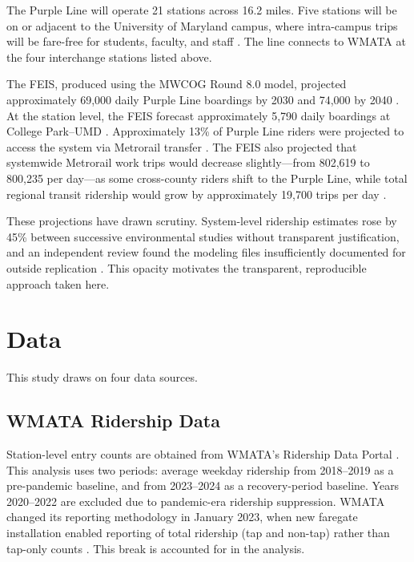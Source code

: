 \documentclass[11pt]{article}
\begin{document}
The Purple Line will operate 21 stations across 16.2 miles. Five stations
will be on or adjacent to the University of Maryland campus, where
intra-campus trips will be fare-free for students, faculty, and staff
\citep{umd_purpleline}. The line connects to WMATA at the four interchange
stations listed above.

The FEIS, produced using the MWCOG Round 8.0 model, projected approximately
69,000 daily Purple Line boardings by 2030 and 74,000 by 2040
\citep{atkinsrealis}. At the station level, the FEIS forecast approximately
5,790 daily boardings at College Park--UMD \citep{collegeparkhousing}.
Approximately 13\% of Purple Line riders were projected to access the system
via Metrorail transfer \citep{sentinel2017}. The FEIS also projected that
systemwide Metrorail work trips would decrease slightly---from 802,619 to
800,235 per day---as some cross-county riders shift to the Purple Line,
while total regional transit ridership would grow by approximately 19,700
trips per day \citep{sentinel2017}.

These projections have drawn scrutiny. System-level ridership estimates rose
by 45\% between successive environmental studies without transparent
justification, and an independent review found the modeling files
insufficiently documented for outside replication \citep{wapost2015}. This
opacity motivates the transparent, reproducible approach taken here.

\section{Data}
\label{sec:data}

This study draws on four data sources.

\subsection{WMATA Ridership Data}

Station-level entry counts are obtained from WMATA's Ridership Data Portal
\citep{wmata_rdp}. This analysis uses two periods: average weekday ridership
from 2018--2019 as a pre-pandemic baseline, and from 2023--2024 as a
recovery-period baseline. Years 2020--2022 are excluded due to pandemic-era
ridership suppression. WMATA changed its reporting methodology in January
2023, when new faregate installation enabled reporting of total ridership
(tap and non-tap) rather than tap-only counts \citep{wmata_rdp}. This break
is accounted for in the analysis.
\end{document}
